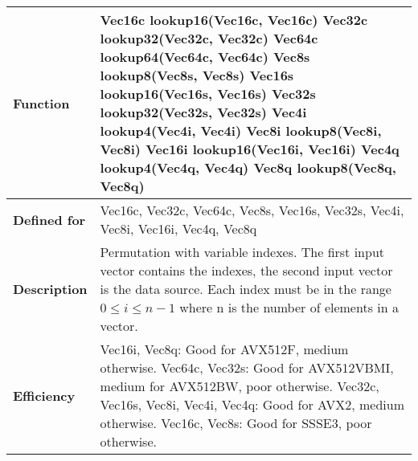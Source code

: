 \documentclass[vcl_manual.tex]{subfiles}
\begin{document}
\begin{tabular}{|p{30mm}|p{120mm}|}
\hline
\bfseries Function & Vec16c lookup16(Vec16c, Vec16c) \newline
Vec32c lookup32(Vec32c, Vec32c) \newline
Vec64c lookup64(Vec64c, Vec64c) \newline
Vec8s lookup8(Vec8s, Vec8s) \newline
Vec16s lookup16(Vec16s, Vec16s) \newline
Vec32s lookup32(Vec32s, Vec32s) \newline
Vec4i lookup4(Vec4i, Vec4i) \newline
Vec8i lookup8(Vec8i, Vec8i) \newline
Vec16i lookup16(Vec16i, Vec16i) \newline
Vec4q lookup4(Vec4q, Vec4q) \newline
Vec8q lookup8(Vec8q, Vec8q) \\ \hline
\bfseries Defined for & Vec16c, Vec32c, Vec64c, Vec8s, Vec16s, Vec32s, Vec4i, Vec8i, Vec16i, Vec4q, Vec8q \\ \hline
\bfseries Description & Permutation with variable indexes. The first input vector contains the indexes, the second input vector is the data source. Each index must be in the range  $0 \leq i \leq n-1$ where n is the number of elements in a vector. \\ \hline
\bfseries Efficiency & 
Vec16i, Vec8q: Good for AVX512F, medium otherwise.  \newline
Vec64c, Vec32s: Good for AVX512VBMI, medium for AVX512BW, poor otherwise. \newline
Vec32c, Vec16s, Vec8i, Vec4i, Vec4q: Good for AVX2, medium otherwise. \newline
Vec16c, Vec8s: Good for SSSE3, poor otherwise. \\ \hline
\end{tabular}
\end{document}
